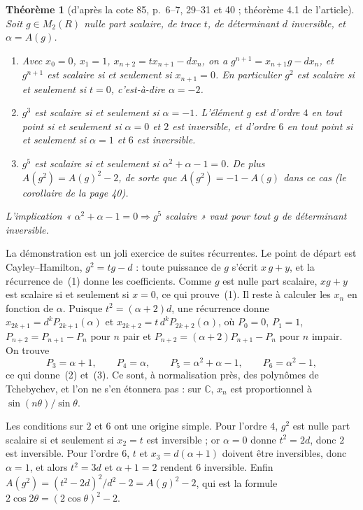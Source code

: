 \documentclass[11pt,a4paper]{amsart}
\theoremstyle{definition}
\theoremstyle{plain}
\newtheorem{theoreme}{Théorème}
\theoremstyle{remark}
\theoremstyle{plain}
\begin{document}
\begin{theoreme}[d'après la cote 85, p.~6--7, 29--31 et 40 ; théorème 4.1 de l'article]\label{th:ordres}
Soit $g \in M_2(R)$ nulle part scalaire, de trace $t$, de déterminant $d$ inversible, et $\alpha = A(g)$.
\begin{enumerate}
\item Avec $x_0 = 0$, $x_1 = 1$, $x_{n+2} = tx_{n+1} - dx_n$, on a $g^{n+1} = x_{n+1}g - dx_n$, et $g^{n+1}$ est scalaire si et seulement si $x_{n+1} = 0$. En particulier $g^2$ est scalaire si et seulement si $t = 0$, c'est-à-dire $\alpha = -2$.
\item $g^3$ est scalaire si et seulement si $\alpha = -1$. L'élément $g$ est d'ordre $4$ en tout point si et seulement si $\alpha = 0$ et $2$ est inversible, et d'ordre $6$ en tout point si et seulement si $\alpha = 1$ et $6$ est inversible.
\item $g^5$ est scalaire si et seulement si $\alpha^2 + \alpha - 1 = 0$. De plus $A(g^2) = A(g)^2 - 2$, de sorte que $A(g^2) = -1 - A(g)$ dans ce cas (le corollaire de la page 40).
\end{enumerate}
L'implication « $\alpha^2 + \alpha - 1 = 0 \Rightarrow g^5$ scalaire » vaut pour tout $g$ de déterminant inversible.
\end{theoreme}

La démonstration est un joli exercice de suites récurrentes. Le point de départ est Cayley--Hamilton, $g^2 = tg - d$ : toute puissance de $g$ s'écrit $x\,g + y$, et la récurrence de~(1) donne les coefficients. Comme $g$ est nulle part scalaire, $xg + y$ est scalaire si et seulement si $x = 0$, ce qui prouve~(1). Il reste à calculer les $x_n$ en fonction de $\alpha$. Puisque $t^2 = (\alpha + 2)d$, une récurrence donne $x_{2k+1} = d^kP_{2k+1}(\alpha)$ et $x_{2k+2} = t\,d^kP_{2k+2}(\alpha)$, où $P_0 = 0$, $P_1 = 1$, $P_{n+2} = P_{n+1} - P_n$ pour $n$ pair et $P_{n+2} = (\alpha + 2)P_{n+1} - P_n$ pour $n$ impair. On trouve
\[
P_3 = \alpha + 1, \qquad P_4 = \alpha, \qquad P_5 = \alpha^2 + \alpha - 1, \qquad P_6 = \alpha^2 - 1,
\]
ce qui donne~(2) et~(3). Ce sont, à normalisation près, des polynômes de Tchebychev, et l'on ne s'en étonnera pas : sur $\mathbb C$, $x_n$ est proportionnel à $\sin(n\theta)/\sin\theta$.

Les conditions sur $2$ et $6$ ont une origine simple. Pour l'ordre $4$, $g^2$ est nulle part scalaire si et seulement si $x_2 = t$ est inversible ; or $\alpha = 0$ donne $t^2 = 2d$, donc $2$ est inversible. Pour l'ordre $6$, $t$ et $x_3 = d(\alpha + 1)$ doivent être inversibles, donc $\alpha = 1$, et alors $t^2 = 3d$ et $\alpha + 1 = 2$ rendent $6$ inversible. Enfin $A(g^2) = (t^2 - 2d)^2/d^2 - 2 = A(g)^2 - 2$, qui est la formule $2\cos 2\theta = (2\cos\theta)^2 - 2$.
\end{document}
